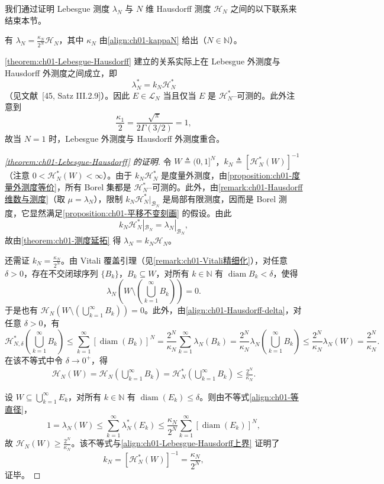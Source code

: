 \documentclass[../../main.tex]{subfiles}%
\begin{document}
我们通过证明 Lebesgue 测度 $\lambda_N$ 与 $N$ 维 Hausdorff 测度 $\mathcal{H}_N$ 之间的以下联系来结束本节。

\begin{theorem}\label{theorem:ch01-Lebesgue-Hausdorff}
有 $\lambda_N=\frac{\kappa_N}{2^N}\mathcal{H}_N$，其中 $\kappa_N$ 由\eqref{align:ch01-kappaN} 给出（$N\in\mathbb{N}$）。
\end{theorem}

\begin{remark}\label{remark:ch01-Lebesgue-Hausdorff}
\cref{theorem:ch01-Lebesgue-Hausdorff} 建立的关系实际上在 Lebesgue 外测度与 Hausdorff 外测度之间成立，即
\[
\lambda_N^*=k_N\mathcal{H}_N^*
\]
（见文献~[45, Satz III.2.9]）。因此 $E\in\mathcal{L}_N$ 当且仅当 $E$ 是 $\mathcal{H}_N^*$--可测的。此外注意到
\[
\frac{\kappa_1}{2}=\frac{\sqrt{\pi}}{2\Gamma(3/2)}=1,
\]
故当 $N=1$ 时，Lebesgue 外测度与 Hausdorff 外测度重合。
\end{remark}

\begin{proof}[\cref{theorem:ch01-Lebesgue-Hausdorff} 的证明]
令 $W\triangleq (0,1]^N$，$k_N\triangleq [\mathcal{H}_N^*(W)]^{-1}$（注意 $0<\mathcal{H}_N^*(W)<\infty$）。由于 $k_N\mathcal{H}_N^*$ 是度量外测度，由\cref{proposition:ch01-度量外测度等价}，所有 Borel 集都是 $\mathcal{H}_N^*$--可测的。此外，由\cref{remark:ch01-Hausdorff维数与测度}（取 $\mu=\lambda_N$），限制 $k_N\mathcal{H}_N^*|_{\mathcal{B}_N}$ 是局部有限测度，因而是 Borel 测度，它显然满足\cref{proposition:ch01-平移不变刻画} 的假设。由此
\[
k_N\mathcal{H}_N^*|_{\mathcal{B}_N}=\lambda_N|_{\mathcal{B}_N},
\]
故由\cref{theorem:ch01-测度延拓} 得 $\lambda_N=k_N\mathcal{H}_N$。

还需证 $k_N=\frac{\kappa_N}{2^N}$。由 Vitali 覆盖引理（见\cref{remark:ch01-Vitali精细化}），对任意 $\delta>0$，存在不交闭球序列 $\{B_k\}$，$B_k\subseteq W$，对所有 $k\in\mathbb{N}$ 有 $\operatorname{diam}B_k<\delta$，使得
\[
\lambda_N\left(W\setminus\left(\bigcup_{k=1}^\infty B_k\right)\right)=0.
\]
于是也有 $\mathcal{H}_N\left(W\setminus\left(\bigcup_{k=1}^\infty B_k\right)\right)=0$。此外，由\eqref{align:ch01-Hausdorff-delta}，对任意 $\delta>0$，有
\[
\mathcal{H}_{N,\delta}^*\left(\bigcup_{k=1}^\infty B_k\right)
\leqslant\sum_{k=1}^\infty[\operatorname{diam}(B_k)]^N
=\frac{2^N}{\kappa_N}\sum_{k=1}^\infty\lambda_N(B_k)
=\frac{2^N}{\kappa_N}\lambda_N\left(\bigcup_{k=1}^\infty B_k\right)
\leqslant\frac{2^N}{\kappa_N}\lambda_N(W)=\frac{2^N}{\kappa_N}.
\]
在该不等式中令 $\delta\to0^+$，得
\begin{align}
\mathcal{H}_N(W)=\mathcal{H}_N\left(\bigcup_{k=1}^\infty B_k\right)
=\mathcal{H}_N^*\left(\bigcup_{k=1}^\infty B_k\right)\leqslant\frac{2^N}{\kappa_N}. \label{align:ch01-Lebesgue-Hausdorff上界}
\end{align}

设 $W\subseteq\bigcup_{k=1}^\infty E_k$，对所有 $k\in\mathbb{N}$ 有 $\operatorname{diam}(E_k)\leqslant\delta$。则由不等式\eqref{align:ch01-等直径}，
\[
1=\lambda_N(W)\leqslant\sum_{k=1}^\infty\lambda_N^*(E_k)
\leqslant\frac{\kappa_N}{2^N}\sum_{k=1}^\infty[\operatorname{diam}(E_k)]^N,
\]
故 $\mathcal{H}_N(W)\geqslant\frac{2^N}{\kappa_N}$。该不等式与\eqref{align:ch01-Lebesgue-Hausdorff上界} 证明了
\[
k_N=[\mathcal{H}_N^*(W)]^{-1}=\frac{\kappa_N}{2^N},
\]
证毕。
\end{proof}
\end{document}
